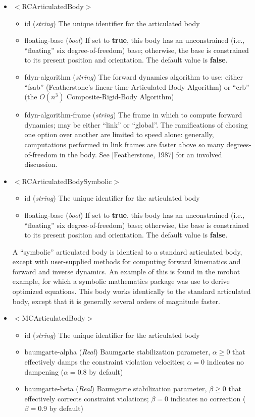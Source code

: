 \documentclass{article}
\begin{document}
\begin{landscape}
\begin{itemize}
 \item $<$RCArticulatedBody$>$
\begin{itemize}
\item id  (\emph{string}) The unique identifier for the articulated body
\item floating-base  (\emph{bool}) If set to \textbf{true}, this body has an unconstrained (i.e., ``floating'' six degree-of-freedom) base; otherwise, the base is constrained to its present position and orientation.  The default value is \textbf{false}.
\item fdyn-algorithm  (\emph{string}) The forward dynamics algorithm to use: either ``fsab'' (Featherstone's linear time Articulated Body Algorithm) or ``crb'' (the $O(n^3)$ Composite-Rigid-Body Algorithm)
\item fdyn-algorithm-frame  (\emph{string}) The frame in which to compute forward dynamics; may be either ``link'' or ``global''.  The ramifications of chosing one option over another are limited to speed alone: generally, computations performed in link frames are faster above so many degrees-of-freedom in the body.  See [Featherstone, 1987] for an involved discussion.
\end{itemize}

\item $<$RCArticulatedBodySymbolic$>$
\begin{itemize}
\item id  (\emph{string}) The unique identifier for the articulated body
\item floating-base  (\emph{bool}) If set to \textbf{true}, this body has an unconstrained (i.e., ``floating'' six degree-of-freedom) base; otherwise, the base is constrained to its present position and orientation.  The default value is \textbf{false}.
\end{itemize}

A ``symbolic'' articulated body is identical to a standard articulated body, except with user-supplied methods for computing forward kinematics and forward and inverse dynamics.  An example of this is found in the mrobot example, for which a symbolic mathematics package was use to derive optimized equations.  This body works identically to the standard articulated body, except that it is generally several orders of magnitude faster.

\item $<$MCArticulatedBody$>$
\begin{itemize}
\item id  (\emph{string}) The unique identifier for the articulated body
\item baumgarte-alpha  (\emph{Real}) Baumgarte stabilization parameter, $\alpha \geq 0$ that effectively damps the constraint violation velocities; $\alpha = 0$ indicates no dampening ($\alpha = 0.8$ by default)
\item baumgarte-beta  (\emph{Real}) Baumgarte stabilization parameter, $\beta \geq 0$ that effectively corrects constraint violations; $\beta = 0$ indicates no correction ($\beta = 0.9$ by default)
\end{itemize}


\end{itemize}
\end{landscape}
\end{document}
